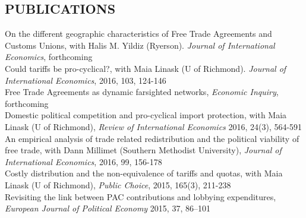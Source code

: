 \documentclass[11pt]{res}
\begin{document}
\begin{resume}
\section{PUBLICATIONS}\vspace{1.5mm}
{On the different geographic characteristics of Free Trade Agreements and Customs Unions}, with Halis M. Yildiz (Ryerson). \emph{Journal of International Economics}, forthcoming\vspace{1.5mm}\\
{Could tariffs be pro-cyclical?}, with Maia Linask (U of Richmond). \emph{Journal of International Economics}, 2016, 103, 124-146 \vspace{1.5mm}\\
{ Free Trade Agreements as dynamic farsighted networks}, \emph{Economic Inquiry}, forthcoming\vspace{1.5mm}\\
{Domestic political competition and pro-cyclical import protection}, with Maia Linask (U of Richmond), \emph{Review of International Economics} 2016, 24(3), 564-591\vspace{1.5mm}\\
{An empirical analysis of trade related redistribution and the political viability of free trade}, with Dann Millimet (Southern Methodist University), \emph{Journal of International Economics}, 2016, 99, 156-178 \vspace{1.5mm}\\
{Costly distribution and the non-equivalence of tariffs and quotas}, with Maia Linask (U of Richmond), \emph{Public Choice}, 2015, 165(3), 211-238 \vspace{1.5mm}\\
{Revisiting the link between PAC contributions and lobbying expenditures, \emph{European Journal of Political Economy}} 2015, 37, 86--101 \vspace{5mm}\\


\phantom{.}\vspace{0.5cm}

\end{resume}
\end{document}
